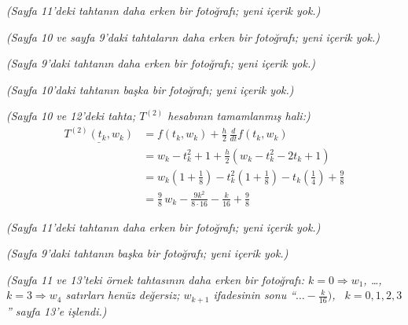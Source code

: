 \documentclass[11pt,a4paper]{article}
\begin{document}
\textit{(Sayfa 11'deki tahtanın daha erken bir fotoğrafı; yeni içerik yok.)}

\textit{(Sayfa 10 ve sayfa 9'daki tahtaların daha erken bir fotoğrafı; yeni içerik yok.)}

\textit{(Sayfa 9'daki tahtanın daha erken bir fotoğrafı; yeni içerik yok.)}

\textit{(Sayfa 10'daki tahtanın başka bir fotoğrafı; yeni içerik yok.)}

\textit{(Sayfa 10 ve 12'deki tahta; $T^{(2)}$ hesabının tamamlanmış hali:)}
\begin{align*}
  \underline{T^{(2)}(t_k, w_k)} &= f(t_k, w_k) + \frac{h}{2}\,\frac{d}{dt} f(t_k, w_k) \\
  &= w_k - t_k^2 + 1 + \frac{h}{2}\left(w_k - t_k^2 - 2t_k + 1\right) \\
  &= w_k\left(1 + \frac{1}{8}\right) - t_k^2\left(1 + \frac{1}{8}\right) - t_k\left(\frac{1}{4}\right) + \frac{9}{8} \\
  &= \frac{9}{8}\,w_k - \frac{9k^2}{8 \cdot 16} - \frac{k}{16} + \frac{9}{8}
\end{align*}

\textit{(Sayfa 11'deki tahtanın daha erken bir fotoğrafı; yeni içerik yok.)}

\textit{(Sayfa 9'daki tahtanın başka bir fotoğrafı; yeni içerik yok.)}

\textit{(Sayfa 11 ve 13'teki örnek tahtasının daha erken bir fotoğrafı: $k = 0 \Rightarrow w_1$, \dots,
$k = 3 \Rightarrow w_4$ satırları henüz değersiz; $w_{k+1}$ ifadesinin sonu
``$\dots - \frac{k}{16}\bigr)$, \ $k = 0, 1, 2, 3$'' sayfa 13'e işlendi.)}
\end{document}

